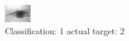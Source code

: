 \begin{figure}[h!]
\begin{center}
\includegraphics[width=0.60\columnwidth]{figures/ID456_class_1_target_2.png}
\end{center}
\caption{ Classification: 1 actual target: 2}
\label{fig:ID456_class_1_target_2}
\end{figure}
